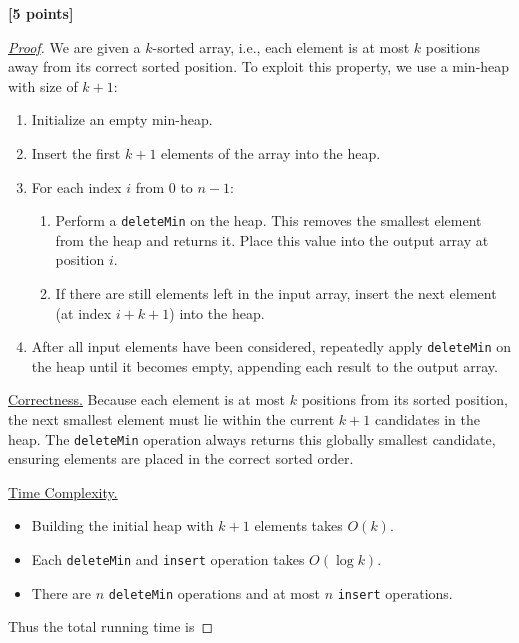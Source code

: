 \documentclass[11pt]{article}
\begin{document}
\begin{enumerate}
\begin{flushright}
\end{flushright}

\begin{flushright}
\textbf{[5 points]}
\end{flushright}

\begin{proof}[\underline{Proof}]

We are given a \(k\)-sorted array, i.e., each element is at most \(k\) positions away from its correct sorted position. To exploit this property, we use a min-heap with size of \(k+1\):

\begin{enumerate}[label=\arabic*.]
\item Initialize an empty min-heap.
\item Insert the first $k+1$ elements of the array into the heap.
\item For each index $i$ from $0$ to $n-1$:
\begin{enumerate}
\item Perform a \texttt{deleteMin} on the heap. This removes the smallest element from the heap and returns it. Place this value into the output array at position $i$.
\item If there are still elements left in the input array, insert the next element (at index $i+k+1$) into the heap.
\end{enumerate}
\item After all input elements have been considered, repeatedly apply \texttt{deleteMin} on the heap until it becomes empty, appending each result to the output array.
\end{enumerate}

\underline{Correctness.} Because each element is at most $k$ positions from its sorted position, the next smallest element must lie within the current $k+1$ candidates in the heap. The \texttt{deleteMin} operation always returns this globally smallest candidate, ensuring elements are placed in the correct sorted order.

\underline{Time Complexity.}
\begin{itemize}
\item Building the initial heap with $k+1$ elements takes $O(k)$.
\item Each \texttt{deleteMin} and \texttt{insert} operation takes $O(\log k)$.
\item There are $n$ \texttt{deleteMin} operations and at most $n$ \texttt{insert} operations.
\end{itemize}
Thus the total running time is


\end{proof}
\end{enumerate}
\end{document}
